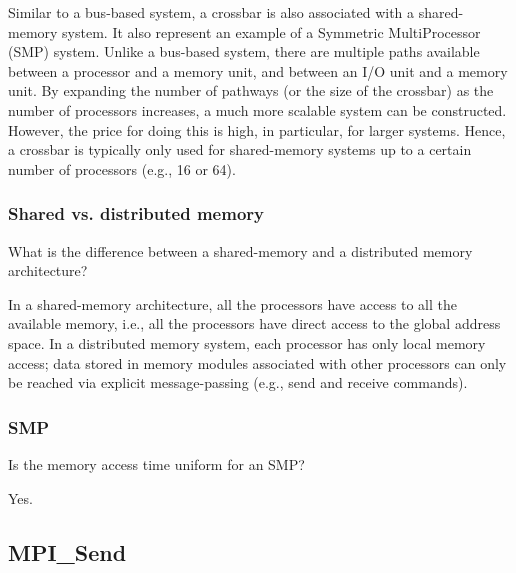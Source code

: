 Similar to a bus-based system, a crossbar is also associated with a shared-memory system. It also represent an example of a Symmetric MultiProcessor (SMP) system. Unlike a bus-based system, there are multiple paths available between a processor and a memory unit, and between an I/O unit and a memory unit. By expanding the number of pathways (or the size of the crossbar) as the number of processors increases, a much more scalable system can be constructed. However, the price for doing this is high, in particular, for larger systems. Hence, a crossbar is typically only used for shared-memory systems up to a certain number of processors (e.g., 16 or 64).

\subsubsection{Shared vs. distributed memory} %
\label{ssub:shared_vs_distributed_memory}

\begin{question}
  What is the difference between a shared-memory and a distributed memory architecture?
\end{question}

In a shared-memory architecture, all the processors have access to all the available memory, i.e., all the processors have direct access to the global address space. In a distributed memory system, each processor has only local memory access; data stored in memory modules associated with other processors can only be reached via explicit message-passing (e.g., send and receive commands).

\subsubsection{SMP} %
\label{ssub:smp}

\begin{question}
  Is the memory access time uniform for an SMP?
\end{question}

Yes.



\subsection{MPI\_Send} %
\label{sub:mpi_send}

